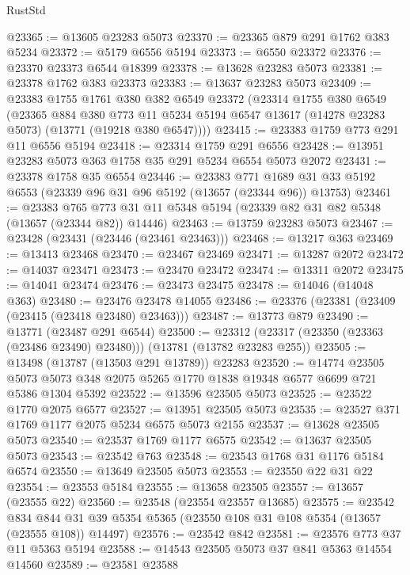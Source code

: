\begin{lexlean}{RustStd}
\begin{coremodule}
@23365 := @13605 @23283 @5073
@23370 := @23365 @879 @291 @1762 @383 @5234
@23372 := @5179 @6556 @5194
@23373 := @6550 @23372
@23376 := @23370 @23373 @6544 @18399
@23378 := @13628 @23283 @5073
@23381 := @23378 @1762 @383 @23373
@23383 := @13637 @23283 @5073
@23409 := @23383
    @1755
    @1761
    @380
    @382
    @6549
    @23372
    (@23314
      @1755
      @380
      @6549
      (@23365
        @884
        @380
        @773
        @11
        @5234
        @5194
        @6547
        @13617
        (@14278 @23283 @5073)
        (@13771 (@19218 @380 @6547))))
@23415 := @23383 @1759 @773 @291 @11 @6556 @5194
@23418 := @23314 @1759 @291 @6556
@23428 := @13951 @23283 @5073 @363 @1758 @35 @291 @5234 @6554 @5073 @2072
@23431 := @23378 @1758 @35 @6554
@23446 := @23383
    @771
    @1689
    @31
    @33
    @5192
    @6553
    (@23339 @96 @31 @96 @5192 (@13657 (@23344 @96)) @13753)
@23461 := @23383
    @765
    @773
    @31
    @11
    @5348
    @5194
    (@23339 @82 @31 @82 @5348 (@13657 (@23344 @82)) @14446)
@23463 := @13759 @23283 @5073
@23467 := @23428 (@23431 (@23446 (@23461 @23463)))
@23468 := @13217 @363
@23469 := @13413 @23468
@23470 := @23467 @23469
@23471 := @13287 @2072
@23472 := @14037 @23471
@23473 := @23470 @23472
@23474 := @13311 @2072
@23475 := @14041 @23474
@23476 := @23473 @23475
@23478 := @14046 (@14048 @363)
@23480 := @23476 @23478 @14055
@23486 := @23376 (@23381 (@23409 (@23415 (@23418 @23480) @23463)))
@23487 := @13773 @879
@23490 := @13771 (@23487 @291 @6544)
@23500 := @23312 (@23317 (@23350 (@23363 (@23486 @23490) @23480))) (@13781 (@13782 @23283 @255))
@23505 := @13498 (@13787 (@13503 @291 @13789)) @23283
@23520 := @14774
    @23505
    @5073
    @5073
    @348
    @2075
    @5265
    @1770
    @1838
    @19348
    @6577
    @6699
    @721
    @5386
    @1304
    @5392
@23522 := @13596 @23505 @5073
@23525 := @23522 @1770 @2075 @6577
@23527 := @13951 @23505 @5073
@23535 := @23527 @371 @1769 @1177 @2075 @5234 @6575 @5073 @2155
@23537 := @13628 @23505 @5073
@23540 := @23537 @1769 @1177 @6575
@23542 := @13637 @23505 @5073
@23543 := @23542 @763
@23548 := @23543 @1768 @31 @1176 @5184 @6574
@23550 := @13649 @23505 @5073
@23553 := @23550 @22 @31 @22
@23554 := @23553 @5184
@23555 := @13658 @23505
@23557 := @13657 (@23555 @22)
@23560 := @23548 (@23554 @23557 @13685)
@23575 := @23542
    @834
    @844
    @31
    @39
    @5354
    @5365
    (@23550 @108 @31 @108 @5354 (@13657 (@23555 @108)) @14497)
@23576 := @23542 @842
@23581 := @23576 @773 @37 @11 @5363 @5194
@23588 := @14543 @23505 @5073 @37 @841 @5363 @14554 @14560
@23589 := @23581 @23588

\end{coremodule}
\end{lexlean}
